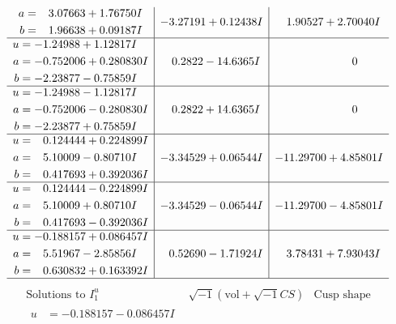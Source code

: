 \documentclass[1p]{elsarticle_modified}
\theoremstyle{definition}
\newcommand{\I}{\sqrt{-1}}
\begin{document}
$$\begin{array}{c|c|c}
\begin{aligned}
a &= \phantom{-}3.07663 + 1.76750 I \\
b &= \phantom{-}1.96638 + 0.09187 I\end{aligned}
 & -3.27191 + 0.12438 I & \phantom{-}1.90527 + 2.70040 I \\ \hline\begin{aligned}
u &= -1.24988 + 1.12817 I \\
a &= -0.752006 + 0.280830 I \\
b &= -2.23877 - 0.75859 I\end{aligned}
 & \phantom{-}0.2822 - 14.6365 I & \phantom{-0.000000 } 0 \\ \hline\begin{aligned}
u &= -1.24988 - 1.12817 I \\
a &= -0.752006 - 0.280830 I \\
b &= -2.23877 + 0.75859 I\end{aligned}
 & \phantom{-}0.2822 + 14.6365 I & \phantom{-0.000000 } 0 \\ \hline\begin{aligned}
u &= \phantom{-}0.124444 + 0.224899 I \\
a &= \phantom{-}5.10009 - 0.80710 I \\
b &= \phantom{-}0.417693 + 0.392036 I\end{aligned}
 & -3.34529 + 0.06544 I & -11.29700 + 4.85801 I \\ \hline\begin{aligned}
u &= \phantom{-}0.124444 - 0.224899 I \\
a &= \phantom{-}5.10009 + 0.80710 I \\
b &= \phantom{-}0.417693 - 0.392036 I\end{aligned}
 & -3.34529 - 0.06544 I & -11.29700 - 4.85801 I \\ \hline\begin{aligned}
u &= -0.188157 + 0.086457 I \\
a &= \phantom{-}5.51967 - 2.85856 I \\
b &= \phantom{-}0.630832 + 0.163392 I\end{aligned}
 & \phantom{-}0.52690 - 1.71924 I & \phantom{-}3.78431 + 7.93043 I\\
 \hline 
 \end{array}$$\newpage$$\begin{array}{c|c|c}  
\text{Solutions to }I^u_{1}& \I (\text{vol} + \sqrt{-1}CS) & \text{Cusp shape}\\
 \hline 
\begin{aligned}
u &= -0.188157 - 0.086457 I \\

\end{aligned}
\end{array}$$
\end{document}
